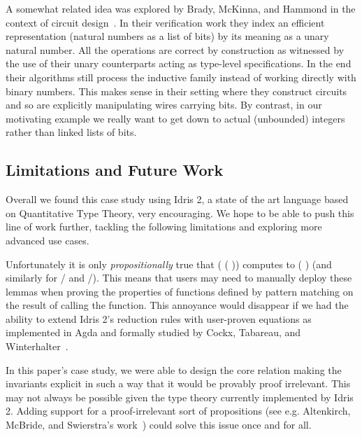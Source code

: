 \documentclass{article}
\newcommand{\idris}{Idris 2}
\begin{document}
A somewhat related idea was explored by Brady, McKinna, and Hammond in the context of
circuit design~\cite{DBLP:conf/sfp/BradyMH07}. In their verification work they index
an efficient representation (natural numbers as a list of bits) by its meaning as a
unary natural number. All the operations are correct by construction as witnessed by
the use of their unary counterparts acting as type-level specifications.
%
In the end their algorithms still process the inductive family instead of working
directly with binary numbers. This makes sense in their setting where they construct
circuits and so are explicitly manipulating wires carrying bits.
%
By contrast, in our motivating example we really want to get down to actual (unbounded)
integers rather than linked lists of bits.


\subsection{Limitations and Future Work}

Overall we found this case study using \idris{}, a state of the art language
based on Quantitative Type Theory, very encouraging.
%
We hope to be able to push this line of work further, tackling the following
limitations and exploring more advanced use cases.

Unfortunately it is only \emph{propositionally} true that
( (  ))
computes to (  ) (and similarly for
/ and /).
%
This means that users may need to manually deploy these lemmas when proving the
properties of functions defined by pattern matching on the result of calling the
 function.
%
This annoyance would disappear if we had the ability to extend \idris{}'s reduction rules
with user-proven equations as implemented in Agda and formally studied
by Cockx, Tabareau, and Winterhalter~\cite{DBLP:journals/pacmpl/CockxTW21}.

In this paper's case study, we were able to design the core 
relation making the invariants explicit in such a way that it would be provably
proof irrelevant.
%
This may not always be possible given the type theory currently implemented by
\idris{}. Adding support for a proof-irrelevant sort of propositions (see e.g.
Altenkirch, McBride, and Swierstra's work~\cite{DBLP:conf/plpv/AltenkirchMS07})
could solve this issue once and for all.
\end{document}
